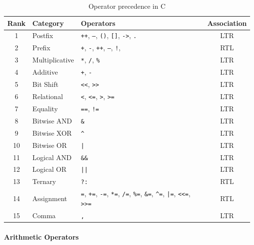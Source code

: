 \documentclass{article}
\newcommand{\code}[1]{\texttt{#1}}
\begin{document}
\begin{table}[H]
    \centering
    \begin{tabular}{|c|l|p{5cm}|c|}
        \hline
        \textbf{Rank} & \textbf{Category} & \textbf{Operators} & \textbf{Association} \\
        \hline
        1 & Postfix & \code{++}, \code{--}, \code{()}, \code{[]}, \code{->}, \code{.} & LTR \\
        \hline
        2 & Prefix & \code{+}, \code{-}, \code{++}, \code{--}, \code{!}, \code{~} & RTL \\
        \hline
        3 & Multiplicative & \code{*}, \code{/}, \code{\%} & LTR \\
        \hline
        4 & Additive & \code{+}, \code{-} & LTR \\
        \hline
        5 & Bit Shift & \code{<<}, \code{>>} & LTR \\
        \hline
        6 & Relational & \code{<}, \code{<=}, \code{>}, \code{>=} & LTR \\
        \hline
        7 & Equality & \code{==}, \code{!=} & LTR \\
        \hline
        8 & Bitwise AND & \code{\&} & LTR \\
        \hline
        9 & Bitwise XOR & \code{\^} & LTR \\
        \hline
        10 & Bitwise OR & \code{|} & LTR \\
        \hline
        11 & Logical AND & \code{\&\&} & LTR \\
        \hline
        12 & Logical OR & \code{||} & LTR \\
        \hline
        13 & Ternary & \code{?:} & RTL \\
        \hline
        14 & Assignment & \code{=}, \code{+=}, \code{-=}, \code{*=}, \code{/=}, \code{\%=}, \code{\&=}, \code{\^{}=}, \code{|=}, \code{<<=}, \code{>>=} & RTL \\
        \hline
        15 & Comma & \code{,} & LTR \\
        \hline
    \end{tabular}
    \caption{Operator precedence in C}
\end{table}

\paragraph{Arithmetic Operators}
\end{document}
